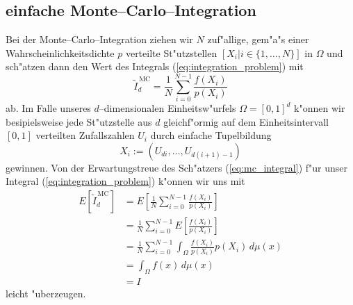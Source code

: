 	\subsection{einfache Monte--Carlo--Integration}
	Bei der Monte--Carlo--Integration ziehen wir $N$ zuf"allige, gem"a"s einer Wahrscheinlichkeitsdichte $p$ verteilte St"utzstellen $[X_i|i\in\{1,\dots,N\}]$ in $\Omega$ und sch"atzen dann den Wert des Integrals (\ref{eq:integration_problem}) mit
	\begin{equation}
		{\tilde I}_d^{\,\text{MC}}=\frac{1}{N}\sum_{i=0}^{N-1} \frac{f(X_i)}{p(X_i)}
		\label{eq:mc_integral}
	\end{equation}
	ab. Im Falle unseres $d$--dimensionalen Einheitsw"urfels $\Omega=[0,1]^d$ k"onnen wir besipielsweise jede St"utzstelle aus $d$ gleichf"ormig auf dem Einheitsintervall $[0,1]$ verteilten Zufallszahlen $U_i$ durch einfache Tupelbildung
	$$X_i:=(U_{d i},\dots,U_{d(i+1)-1})$$
	gewinnen. Von der Erwartungstreue des Sch"atzers (\ref{eq:mc_integral}) f"ur unser Integral (\ref{eq:integration_problem}) k"onnen wir uns mit \citep[][2.4]{Veach:1997p9136}
	\begin{align*}
		E[{\tilde I}_d^{\,\text{MC}}] &=E\left[\frac{1}{N}\sum_{i=0}^{N-1}\frac{f(X_i)}{p(X_i)}\right] \\
			&= \frac{1}{N}\sum_{i=0}^{N-1}E\left[\frac{f(X_i)}{p(X_i)}\right] \\
			&= \frac{1}{N}\sum_{i=0}^{N-1}\int_\Omega \frac{f(X_i)}{p(X_i)}p(X_i)\,d\mu(x) \\
			&= \int_\Omega f(x)\,d\mu(x)\\
			&= I
	\end{align*}
	leicht "uberzeugen.
	
